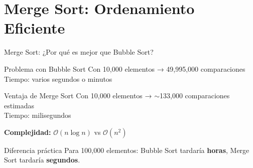 \documentclass[10pt]{beamer}
\begin{document}
\section{Merge Sort: Ordenamiento Eficiente}

\begin{frame}{Merge Sort: ¿Por qué es mejor que Bubble Sort?}
  \begin{block}{Problema con Bubble Sort}
	    Con 10,000 elementos → 49,995,000 comparaciones \\
    Tiempo: varios segundos o minutos
  \end{block}
  
  \begin{block}{Ventaja de Merge Sort}
	    Con 10,000 elementos → $\sim$133,000 comparaciones estimadas \\
    Tiempo: milisegundos
  \end{block}
  
  \textbf{Complejidad:} $\mathcal{O}(n \log n)$ vs $\mathcal{O}(n^2)$
  
  \begin{alertblock}{Diferencia práctica}
    Para 100,000 elementos: Bubble Sort tardaría \textbf{horas}, 
    Merge Sort tardaría \textbf{segundos}.
  \end{alertblock}
\end{frame}
\end{document}
